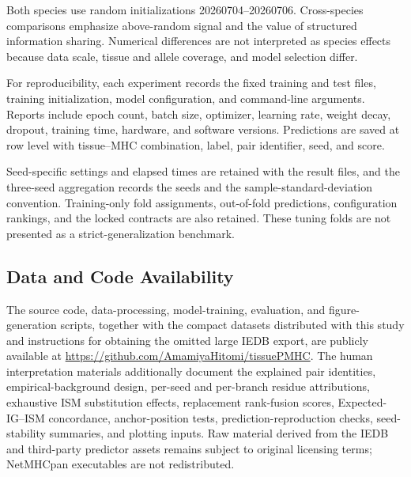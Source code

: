Both species use random initializations 20260704--20260706. Cross-species comparisons emphasize above-random signal and the value of structured information sharing. Numerical differences are not interpreted as species effects because data scale, tissue and allele coverage, and model selection differ.

For reproducibility, each experiment records the fixed training and test files, training initialization, model configuration, and command-line arguments. Reports include epoch count, batch size, optimizer, learning rate, weight decay, dropout, training time, hardware, and software versions. Predictions are saved at row level with tissue--MHC combination, label, pair identifier, seed, and score.

Seed-specific settings and elapsed times are retained with the result files, and the three-seed aggregation records the seeds and the sample-standard-deviation convention. Training-only fold assignments, out-of-fold predictions, configuration rankings, and the locked contracts are also retained. These tuning folds are not presented as a strict-generalization benchmark.

\subsection{Data and Code Availability}

The source code, data-processing, model-training, evaluation, and figure-generation scripts, together with the compact datasets distributed with this study and instructions for obtaining the omitted large IEDB export, are publicly available at \url{https://github.com/AmamiyaHitomi/tissuePMHC}. The human interpretation materials additionally document the explained pair identities, empirical-background design, per-seed and per-branch residue attributions, exhaustive ISM substitution effects, replacement rank-fusion scores, Expected-IG--ISM concordance, anchor-position tests, prediction-reproduction checks, seed-stability summaries, and plotting inputs. Raw material derived from the IEDB and third-party predictor assets remains subject to original licensing terms; NetMHCpan executables are not redistributed.
